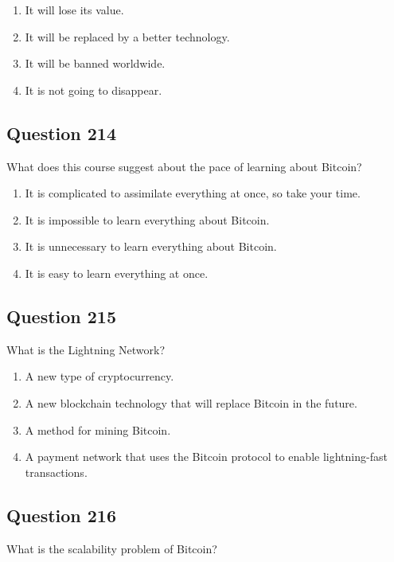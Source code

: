 \documentclass[12pt,a4paper]{article}
\begin{document}
\begin{enumerate}[label=\Alph*., leftmargin=*]
\item It will lose its value.
\item It will be replaced by a better technology.
\item It will be banned worldwide.
\item It is not going to disappear.
\end{enumerate}

\bigskip


\subsection*{Question 214}
What does this course suggest about the pace of learning about Bitcoin?

\begin{enumerate}[label=\Alph*., leftmargin=*]
\item It is complicated to assimilate everything at once, so take your time.
\item It is impossible to learn everything about Bitcoin.
\item It is unnecessary to learn everything about Bitcoin.
\item It is easy to learn everything at once.
\end{enumerate}

\bigskip


\subsection*{Question 215}
What is the Lightning Network?

\begin{enumerate}[label=\Alph*., leftmargin=*]
\item A new type of cryptocurrency.
\item A new blockchain technology that will replace Bitcoin in the future.
\item A method for mining Bitcoin.
\item A payment network that uses the Bitcoin protocol to enable lightning-fast transactions.
\end{enumerate}

\bigskip


\subsection*{Question 216}
What is the scalability problem of Bitcoin?
\end{document}
